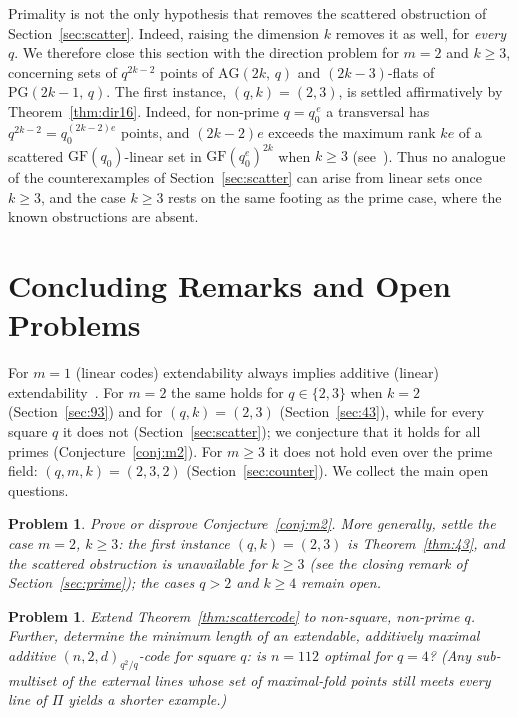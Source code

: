 \documentclass[12pt]{article}
\newtheorem{prob}[thm]{Problem}
\theoremstyle{definition}
\numberwithin{equation}{section}
\newcommand{\GF}[1]{\mathrm{GF}(#1)}
\newcommand{\PG}[2]{\mathrm{PG}(#1,\,#2)}
\newcommand{\AG}[2]{\mathrm{AG}(#1,\,#2)}
\begin{document}
Primality is not the only hypothesis that removes the scattered obstruction of Section~\ref{sec:scatter}. Indeed,  raising the dimension $k$ removes it as well, for \emph{every} $q$.  We therefore close this section with the direction problem for $m=2$ and $k\geq3$, concerning sets of $q^{2k-2}$ points of $\AG{2k}{q}$ and $(2k-3)$-flats of $\PG{2k-1}{q}$. The first instance, $(q,k)=(2,3)$, is settled affirmatively by Theorem~\ref{thm:dir16}.  Indeed, for non-prime $q=q_0^{\,e}$ a transversal has $q^{2k-2}=q_0^{(2k-2)e}$ points, and $(2k-2)e$ exceeds the maximum rank $ke$ of a scattered $\GF{q_0}$-linear set in $\GF{q_0^e}^{2k}$ when $k\geq3$ (see~\cite{MR1772204}).  Thus no analogue of the counterexamples of Section~\ref{sec:scatter} can arise from linear sets once $k\geq3$, and the case $k\geq3$ rests on the same footing as the prime case, where the known obstructions are absent.


\section{Concluding Remarks and Open Problems}
\label{sec:remarks}

For $m=1$  (linear codes) extendability always implies additive (linear) extendability~\cite{MR2529622}.  For $m=2$ the same holds for $q\in\{2,3\}$ when $k=2$ (Section~\ref{sec:93}) and for $(q,k)=(2,3)$ (Section~\ref{sec:43}), while for every square $q$ it does not (Section~\ref{sec:scatter}); we conjecture that it holds for all primes (Conjecture~\ref{conj:m2}).  For $m\geq3$ it does not hold even over the prime field: $(q,m,k)=(2,3,2)$ (Section~\ref{sec:counter}).  We collect the main open questions.

\begin{prob}
Prove or disprove Conjecture~\ref{conj:m2}.  More generally, settle the case $m=2$, $k\geq3$: the first instance $(q,k)=(2,3)$ is Theorem~\ref{thm:43}, and the scattered obstruction is unavailable for $k\geq3$ (see the closing remark of Section~\ref{sec:prime}); the cases $q>2$ and $k\geq4$ remain open.
\end{prob}

\begin{prob}\label{prob:nonsquare}
Extend Theorem~\ref{thm:scattercode} to non-square, non-prime $q$.  %
Further, determine the minimum length of an extendable, additively maximal additive $(n,2,d)_{q^2/q}$-code for square $q$: is $n=112$ optimal for $q=4$? (Any sub-multiset of the external lines whose set of maximal-fold points still meets every line of $\Pi$ yields a shorter example.)
\end{prob}
\end{document}
